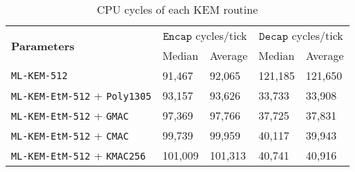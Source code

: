 \documentclass[runningheads]{llncs}
\newcommand{\keygen}{\texttt{KeyGen}}
\newcommand{\encap}{\texttt{Encap}}
\newcommand{\decap}{\texttt{Decap}}
\newcommand{\pk}{\texttt{pk}}
\newcommand{\sk}{\texttt{sk}}
\begin{document}
\begin{table}[h]
    \centering
    \footnotesize
    \caption{CPU cycles of each KEM routine}\label{tbl:kem-performance}

    \begin{tabular}[t]{|p{15em}|p{5em}|p{5em}|p{5em}|p{5em}|}
        \hline
        \multirow{2}{*}{\bf Parameters} 
        & \multicolumn{2}{|c|}{$\encap$ cycles/tick} 
        & \multicolumn{2}{|c|}{$\decap$ cycles/tick} \\
        \cline{2-5}
        & Median & Average & Median & Average \\
        \hline
        \texttt{ML-KEM-512} & 91,467 & 92,065 & 121,185 & 121,650 \\
        \hline
        \texttt{ML-KEM-EtM-512} + \texttt{Poly1305} & 93,157 & 93,626 & 33,733 & 33,908 \\
        \hline
        \texttt{ML-KEM-EtM-512} + \texttt{GMAC} & 97,369 & 97,766 & 37,725 & 37,831 \\
        \hline
        \texttt{ML-KEM-EtM-512} + \texttt{CMAC} & 99,739 & 99,959 & 40,117 & 39,943 \\
        \hline
        \texttt{ML-KEM-EtM-512} + \texttt{KMAC256} & 101,009 & 101,313 & 40,741 & 40,916 \\
        \hline
    \end{tabular}\vspace{0.3cm}


\end{table}
\end{document}
